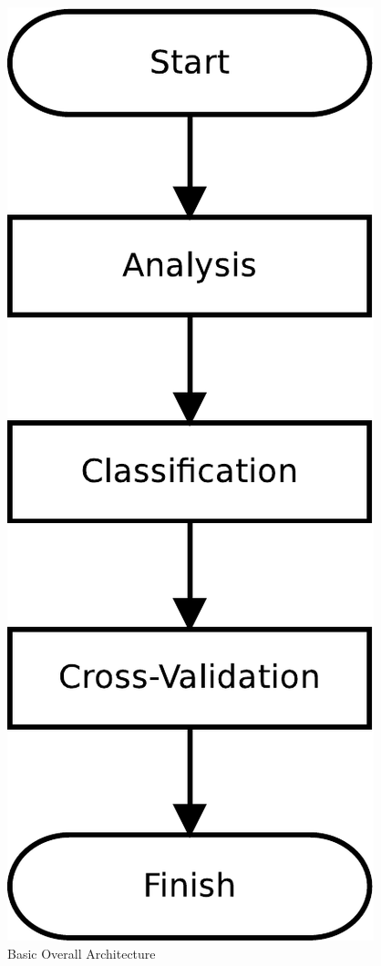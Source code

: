 \begin{figure}[h]
\includegraphics[width=\linewidth]{img/basic-arch}
\caption{Basic Overall Architecture}\label{fig:basic-arch}
\end{figure}

